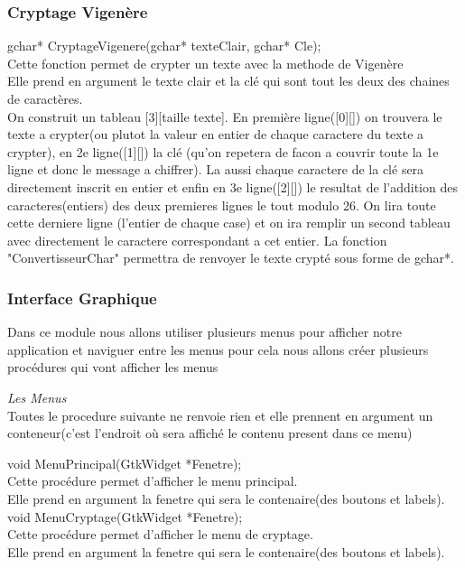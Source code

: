 \documentclass[a4]{article}
\begin{document}
		\subsubsection{Cryptage Vigenère}
	gchar* CryptageVigenere(gchar* texteClair, gchar* Cle);\\
		Cette fonction permet de crypter un texte avec la methode de Vigenère\\
		Elle prend en argument le texte clair et la clé qui sont tout les deux des chaines de caractères.\\
		On construit un tableau [3][taille texte]. En première ligne([0][]) on trouvera le texte a crypter(ou plutot la valeur en entier de chaque caractere du texte a crypter), 
		en 2e ligne([1][]) la clé (qu'on repetera de facon a couvrir toute la 1e ligne et donc le message a chiffrer). La aussi chaque caractere de la clé sera directement inscrit en entier et enfin en 3e ligne([2][]) le resultat de l'addition des caracteres(entiers) des deux premieres lignes le tout modulo 26.
		On lira toute cette derniere ligne (l'entier de chaque case) et on ira remplir un second tableau avec directement le caractere correspondant a cet entier.
		La fonction "ConvertisseurChar" permettra de renvoyer le texte crypté sous forme de gchar*.
		
		\subsubsection{Interface Graphique}
		Dans ce module nous allons utiliser plusieurs menus pour afficher notre application et naviguer 
		entre les menus pour cela nous allons créer plusieurs procédures qui vont afficher les menus  
		
		\textit{Les Menus}\\
		
		Toutes le procedure suivante ne renvoie rien et elle prennent en argument un conteneur(c'est l'endroit où sera affiché le contenu present dans ce menu)
		
	void MenuPrincipal(GtkWidget *Fenetre);\\
		Cette procédure permet d'afficher le menu principal.\\
		Elle prend en argument la fenetre qui sera le contenaire(des boutons et labels).\\
	
	void MenuCryptage(GtkWidget *Fenetre);\\
		Cette procédure permet d'afficher le menu de cryptage.\\
		Elle prend en argument la fenetre qui sera le contenaire(des boutons et labels).\\
\end{document}
